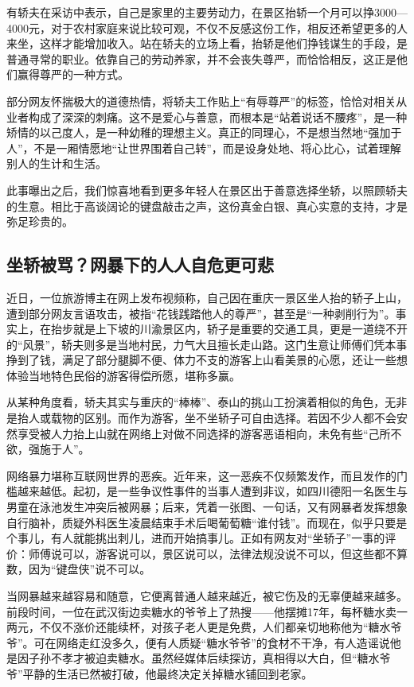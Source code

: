 有轿夫在采访中表示，自己是家里的主要劳动力，在景区抬轿一个月可以挣3000—4000元，对于农村家庭来说比较可观，不仅不反感这份工作，相反还希望更多的人来坐，这样才能增加收入。站在轿夫的立场上看，抬轿是他们挣钱谋生的手段，是普通寻常的职业。依靠自己的劳动养家，并不会丧失尊严，而恰恰相反，这正是他们赢得尊严的一种方式。

部分网友怀揣极大的道德热情，将轿夫工作贴上“有辱尊严”的标签，恰恰对相关从业者构成了深深的刺痛。这不是爱心与善意，而根本是“站着说话不腰疼”，是一种矫情的以己度人，是一种幼稚的理想主义。真正的同理心，不是想当然地“强加于人”，不是一厢情愿地“让世界围着自己转”，而是设身处地、将心比心，试着理解别人的生计和生活。

此事曝出之后，我们惊喜地看到更多年轻人在景区出于善意选择坐轿，以照顾轿夫的生意。相比于高谈阔论的键盘敲击之声，这份真金白银、真心实意的支持，才是弥足珍贵的。


\subsection*{坐轿被骂？网暴下的人人自危更可悲}

近日，一位旅游博主在网上发布视频称，自己因在重庆一景区坐人抬的轿子上山，遭到部分网友言语攻击，被指“花钱践踏他人的尊严”，甚至是“一种剥削行为”。事实上，在抬步就是上下坡的川渝景区内，轿子是重要的交通工具，更是一道绕不开的“风景”，轿夫则多是当地村民，力气大且擅长走山路。这门生意让师傅们凭本事挣到了钱，满足了部分腿脚不便、体力不支的游客上山看美景的心愿，还让一些想体验当地特色民俗的游客得偿所愿，堪称多赢。

从某种角度看，轿夫其实与重庆的“棒棒”、泰山的挑山工扮演着相似的角色，无非是抬人或载物的区别。而作为游客，坐不坐轿子可自由选择。若因不少人都不会安然享受被人力抬上山就在网络上对做不同选择的游客恶语相向，未免有些“己所不欲，强施于人”。

网络暴力堪称互联网世界的恶疾。近年来，这一恶疾不仅频繁发作，而且发作的门槛越来越低。起初，是一些争议性事件的当事人遭到非议，如四川德阳一名医生与男童在泳池发生冲突后被网暴；后来，凭着一张图、一句话，又有网暴者发挥想象自行脑补，质疑外科医生凌晨结束手术后喝葡萄糖“谁付钱”。而现在，似乎只要是个事儿，有人就能挑出刺儿，进而开始搞事儿。正如有网友对“坐轿子”一事的评价：师傅说可以，游客说可以，景区说可以，法律法规没说不可以，但这些都不算数，因为“键盘侠”说不可以。

当网暴越来越容易和随意，它便离普通人越来越近，被它伤及的无辜便越来越多。前段时间，一位在武汉街边卖糖水的爷爷上了热搜——他摆摊17年，每杯糖水卖一两元，不仅不涨价还能续杯，对孩子老人更是免费，人们都亲切地称他为“糖水爷爷”。可在网络走红没多久，便有人质疑“糖水爷爷”的食材不干净，有人造谣说他是因子孙不孝才被迫卖糖水。虽然经媒体后续探访，真相得以大白，但“糖水爷爷”平静的生活已然被打破，他最终决定关掉糖水铺回到老家。

